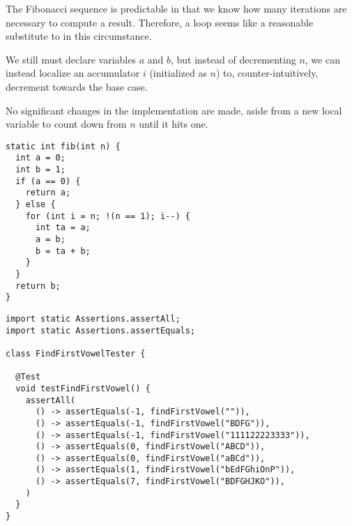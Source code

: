 The Fibonacci sequence is predictable in that we know how many iterations are necessary to compute a result. Therefore, a  loop seems like a reasonable substitute to  in this circumstance. 

We still must declare variables $a$ and $b$, but instead of decrementing $n$, we can instead localize an accumulator $i$ (initialized as $n$) to, counter-intuitively, decrement towards the base case. 

No significant changes in the implementation are made, aside from a new local variable to count down from $n$ until it hits one.

\begin{lstlisting}[language=MyJava]
static int fib(int n) {
  int a = 0;
  int b = 1;
  if (a == 0) {
    return a;
  } else {
    for (int i = n; !(n == 1); i--) {
      int ta = a;
      a = b;
      b = ta + b;
    }
  }
  return b;
}
\end{lstlisting}


\begin{lstlisting}[language=MyJava]
import static Assertions.assertAll;
import static Assertions.assertEquals;

class FindFirstVowelTester {

  @Test
  void testFindFirstVowel() {
    assertAll(
      () -> assertEquals(-1, findFirstVowel("")),
      () -> assertEquals(-1, findFirstVowel("BDFG")),
      () -> assertEquals(-1, findFirstVowel("111122223333")),
      () -> assertEquals(0, findFirstVowel("ABCD")),
      () -> assertEquals(0, findFirstVowel("aBCd")),
      () -> assertEquals(1, findFirstVowel("bEdFGhiOnP")),
      () -> assertEquals(7, findFirstVowel("BDFGHJKO")),
    )
  }
}
\end{lstlisting}

